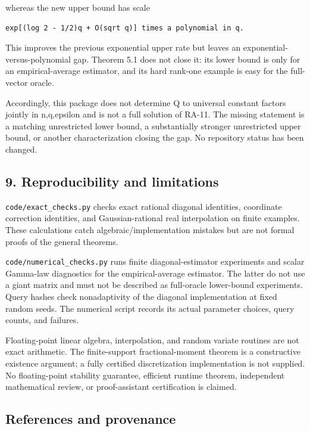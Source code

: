\documentclass[
  10pt,
]{article}
\begin{document}
whereas the new upper bound has scale

\begin{verbatim}
exp[(log 2 - 1/2)q + O(sqrt q)] times a polynomial in q.
\end{verbatim}

This improves the previous exponential upper rate but leaves an
exponential-versus-polynomial gap. Theorem 5.1 does not close it: its
lower bound is only for an empirical-average estimator, and its hard
rank-one example is easy for the full-vector oracle.

Accordingly, this package does not determine Q to universal constant
factors jointly in n,q,epsilon and is not a full solution of RA-11. The
missing statement is a matching unrestricted lower bound, a
substantially stronger unrestricted upper bound, or another
characterization closing the gap. No repository status has been changed.

\subsection{9. Reproducibility and
limitations}\label{reproducibility-and-limitations}

\texttt{code/exact\_checks.py} checks exact rational diagonal
identities, coordinate correction identities, and Gaussian-rational real
interpolation on finite examples. These calculations catch
algebraic/implementation mistakes but are not formal proofs of the
general theorems.

\texttt{code/numerical\_checks.py} runs finite diagonal-estimator
experiments and scalar Gamma-law diagnostics for the empirical-average
estimator. The latter do not use a giant matrix and must not be
described as full-oracle lower-bound experiments. Query hashes check
nonadaptivity of the diagonal implementation at fixed random seeds. The
numerical script records its actual parameter choices, query counts, and
failures.

Floating-point linear algebra, interpolation, and random variate
routines are not exact arithmetic. The finite-support fractional-moment
theorem is a constructive existence argument; a fully certified
discretization implementation is not supplied. No floating-point
stability guarantee, efficient runtime theorem, independent mathematical
review, or proof-assistant certification is claimed.

\subsection{References and provenance}\label{references-and-provenance}
\end{document}
